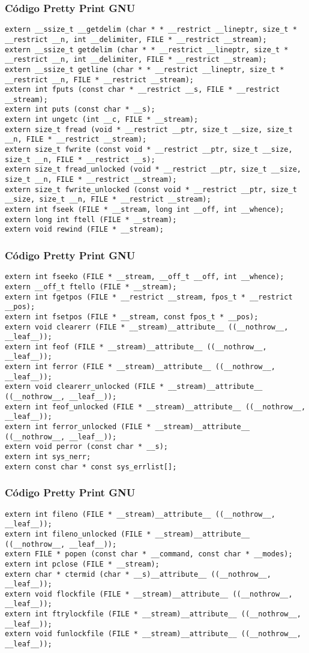 \documentclass{beamer}
\begin{document}
\begin{frame}[fragile]
\frametitle{C\'odigo Pretty Print GNU}
\begin{verbatim}
extern __ssize_t __getdelim (char * * __restrict __lineptr, size_t * __restrict __n, int __delimiter, FILE * __restrict __stream);
extern __ssize_t getdelim (char * * __restrict __lineptr, size_t * __restrict __n, int __delimiter, FILE * __restrict __stream);
extern __ssize_t getline (char * * __restrict __lineptr, size_t * __restrict __n, FILE * __restrict __stream);
extern int fputs (const char * __restrict __s, FILE * __restrict __stream);
extern int puts (const char * __s);
extern int ungetc (int __c, FILE * __stream);
extern size_t fread (void * __restrict __ptr, size_t __size, size_t __n, FILE * __restrict __stream);
extern size_t fwrite (const void * __restrict __ptr, size_t __size, size_t __n, FILE * __restrict __s);
extern size_t fread_unlocked (void * __restrict __ptr, size_t __size, size_t __n, FILE * __restrict __stream);
extern size_t fwrite_unlocked (const void * __restrict __ptr, size_t __size, size_t __n, FILE * __restrict __stream);
extern int fseek (FILE * __stream, long int __off, int __whence);
extern long int ftell (FILE * __stream);
extern void rewind (FILE * __stream);
\end{verbatim}
\end{frame}
\begin{frame}[fragile]
\frametitle{C\'odigo Pretty Print GNU}
\begin{verbatim}
extern int fseeko (FILE * __stream, __off_t __off, int __whence);
extern __off_t ftello (FILE * __stream);
extern int fgetpos (FILE * __restrict __stream, fpos_t * __restrict __pos);
extern int fsetpos (FILE * __stream, const fpos_t * __pos);
extern void clearerr (FILE * __stream)__attribute__ ((__nothrow__, __leaf__));
extern int feof (FILE * __stream)__attribute__ ((__nothrow__, __leaf__));
extern int ferror (FILE * __stream)__attribute__ ((__nothrow__, __leaf__));
extern void clearerr_unlocked (FILE * __stream)__attribute__ ((__nothrow__, __leaf__));
extern int feof_unlocked (FILE * __stream)__attribute__ ((__nothrow__, __leaf__));
extern int ferror_unlocked (FILE * __stream)__attribute__ ((__nothrow__, __leaf__));
extern void perror (const char * __s);
extern int sys_nerr;
extern const char * const sys_errlist[];
\end{verbatim}
\end{frame}
\begin{frame}[fragile]
\frametitle{C\'odigo Pretty Print GNU}
\begin{verbatim}
extern int fileno (FILE * __stream)__attribute__ ((__nothrow__, __leaf__));
extern int fileno_unlocked (FILE * __stream)__attribute__ ((__nothrow__, __leaf__));
extern FILE * popen (const char * __command, const char * __modes);
extern int pclose (FILE * __stream);
extern char * ctermid (char * __s)__attribute__ ((__nothrow__, __leaf__));
extern void flockfile (FILE * __stream)__attribute__ ((__nothrow__, __leaf__));
extern int ftrylockfile (FILE * __stream)__attribute__ ((__nothrow__, __leaf__));
extern void funlockfile (FILE * __stream)__attribute__ ((__nothrow__, __leaf__));
\end{verbatim}
\end{frame}
\end{document}
